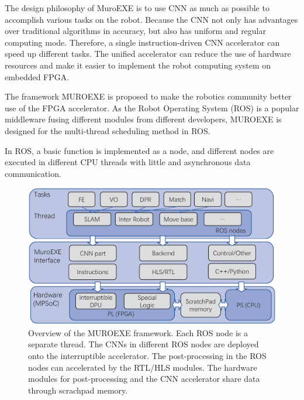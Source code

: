 \label{sec:muroexe}

The design philosophy of MuroEXE is to use CNN as much as possible to accomplish various tasks on the robot. Because the CNN not only has advantages over traditional algorithms in accuracy, but also has uniform and regular computing mode. Therefore, a single instruction-driven CNN accelerator can speed up different tasks. The unified accelerator can reduce the use of hardware resources and make it easier to implement the robot computing system on embedded FPGA.

The framework MUROEXE is proposed to make the robotics community better use of the FPGA accelerator. As the Robot Operating System (ROS) \cite{quigley2009ros} is a popular middleware fusing different modules from different developers, MUROEXE is designed for the multi-thread scheduling method in ROS.

In ROS, a basic function is implemented as a node, and different nodes are executed in different CPU threads with little and asynchronous data communication.


\begin{figure}[t]
	\centering
    \includegraphics[width=0.99\linewidth]{fig/muroexe.eps}
    \caption{ Overview of the MUROEXE framework. Each ROS node is a separate thread. The CNNs in different ROS nodes are deployed onto the interruptible accelerator. The post-processing in the ROS nodes can accelerated by the RTL/HLS modules. The hardware modules for post-processing and the CNN accelerator share data through scrachpad memory. }
	\label{fig:muroexe}
\end{figure}